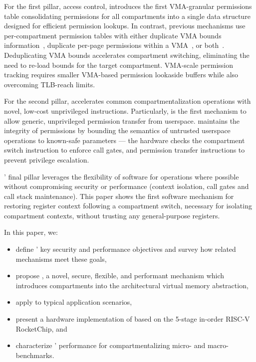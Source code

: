 For the first pillar, access control, \seccells introduces the 
first VMA-granular permissions table consolidating permissions for
all compartments into a single data structure designed for
efficient permission lookups.
In contrast, previous mechanisms use per-compartment permission tables 
with either duplicate VMA bounds information~\cite{WitchelCA02MMP},
duplicate per-page permissions within a 
VMA~\cite{ERIMOberwagner19,SchrammelWSS0MG20Donky},
or both~\cite{DuHXZC19XPC,LittonVE0BD16}.
Deduplicating VMA bounds accelerates compartment switching, eliminating
the need to re-load bounds for the target compartment.
VMA-scale permission tracking requires smaller VMA-based permission
lookaside buffers while also overcoming TLB-reach limits.

For the second pillar, 
\seccells accelerates common compartmentalization operations with
novel, low-cost unprivileged instructions.
Particularly, \seccells is the first mechanism to
allow generic, unprivileged permission transfer from userspace.
\seccells maintains the integrity of permissions by bounding 
the semantics of untrusted userspace operations to known-safe parameters --- 
the hardware checks the compartment switch instruction to enforce call gates,
and permission transfer instructions to prevent privilege escalation.

\seccells' final pillar leverages the flexibility of software for 
operations where possible without compromising security or 
performance (context isolation, call gates and call stack maintenance).
This paper shows the first software mechanism for restoring register context
following a compartment switch, necessary for isolating compartment contexts,
without trusting any general-purpose registers.

In this paper, we:
\begin{itemize}
  \item define \seccells' key security and performance objectives
        and survey how related mechanisms meet these goals,
  \item propose \seccells, a novel, secure, flexible, and performant 
        mechanism which introduces compartments 
        into the architectural virtual memory abstraction,
  \item apply \seccells to typical application scenarios,
  \item present a hardware implementation of \seccells based on the 
        5-stage in-order RISC-V RocketChip, and
  \item characterize \seccells' performance for compartmentalizing
        micro- and macro-benchmarks.
\end{itemize}


